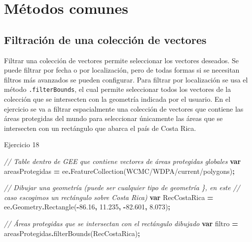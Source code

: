 \documentclass[
  12pt,
  letterpaper,
  twoside]{book}
\newenvironment{Shaded}{\begin{snugshade}}{\end{snugshade}}
\newcommand{\AttributeTok}[1]{\textcolor[rgb]{0.77,0.63,0.00}{#1}}
\newcommand{\CommentTok}[1]{\textcolor[rgb]{0.56,0.35,0.01}{\textit{#1}}}
\newcommand{\FloatTok}[1]{\textcolor[rgb]{0.00,0.00,0.81}{#1}}
\newcommand{\FunctionTok}[1]{\textcolor[rgb]{0.00,0.00,0.00}{#1}}
\newcommand{\KeywordTok}[1]{\textcolor[rgb]{0.13,0.29,0.53}{\textbf{#1}}}
\newcommand{\NormalTok}[1]{#1}
\newcommand{\OperatorTok}[1]{\textcolor[rgb]{0.81,0.36,0.00}{\textbf{#1}}}
\newcommand{\StringTok}[1]{\textcolor[rgb]{0.31,0.60,0.02}{#1}}
\begin{document}
\hypertarget{muxe9todos-comunes-2}{%
\section{Métodos comunes}\label{muxe9todos-comunes-2}}

\hypertarget{filtraciuxf3n-de-una-colecciuxf3n-de-vectores}{%
\subsection*{Filtración de una colección de vectores}\label{filtraciuxf3n-de-una-colecciuxf3n-de-vectores}}

Filtrar una colección de vectores permite seleccionar los vectores deseados. Se puede filtrar por fecha o por localización, pero de todas formas si se necesitan filtros más avanzados se pueden configurar. Para filtrar por localización se usa el método \texttt{.filterBounds}, el cual permite seleccionar todos los vectores de la colección que se intersecten con la geometría indicada por el usuario. En el ejercicio se va a filtrar espacialmente una colección de vectores que contiene las áreas protegidas del mundo para seleccionar únicamente las áreas que se intersecten con un rectángulo que abarca el país de Costa Rica.

Ejercicio 18

\begin{Shaded}
\begin{Highlighting}[]
\CommentTok{// Table dentro de GEE que contiene vectores de áreas protegidas globales}
\KeywordTok{var}\NormalTok{ areasProtegidas }\OperatorTok{=}\NormalTok{ ee}\OperatorTok{.}\FunctionTok{FeatureCollection}\NormalTok{(}\StringTok{\textquotesingle{}WCMC/WDPA/current/polygons\textquotesingle{}}\NormalTok{)}\OperatorTok{;} 

\CommentTok{// Dibujar una geometría (puede ser cualquier tipo de geometría \}, en este}
\CommentTok{// caso escogimos un rectángulo sobre Costa Rica)}
\KeywordTok{var}\NormalTok{ RecCostaRica }\OperatorTok{=}\NormalTok{ ee}\OperatorTok{.}\AttributeTok{Geometry}\OperatorTok{.}\FunctionTok{Rectangle}\NormalTok{(}\OperatorTok{{-}}\FloatTok{86.16}\OperatorTok{,} \FloatTok{11.235}\OperatorTok{,} \OperatorTok{{-}}\FloatTok{82.601}\OperatorTok{,} \FloatTok{8.073}\NormalTok{)}\OperatorTok{;}

\CommentTok{// Áreas protegidas que se intersectan con el rectángulo dibujado}
\KeywordTok{var}\NormalTok{ filtro }\OperatorTok{=}\NormalTok{ areasProtegidas}\OperatorTok{.}\FunctionTok{filterBounds}\NormalTok{(RecCostaRica)}\OperatorTok{;}
\end{Highlighting}
\end{Shaded}
\end{document}
